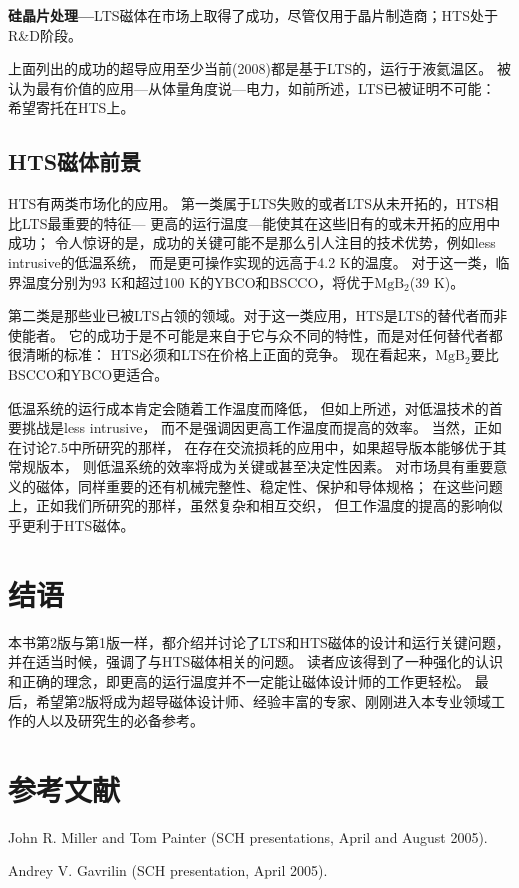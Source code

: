 \textbf{硅晶片处理---}LTS磁体在市场上取得了成功，尽管仅用于晶片制造商；HTS处于R\&D阶段。

上面列出的成功的超导应用至少当前(2008)都是基于LTS的，运行于液氦温区。
被认为最有价值的应用---从体量角度说---电力，如前所述，LTS已被证明不可能：
希望寄托在HTS上。

\subsection{HTS磁体前景}
HTS有两类市场化的应用。
第一类属于LTS失败的或者LTS从未开拓的，HTS相比LTS最重要的特征---
更高的运行温度---能使其在这些旧有的或未开拓的应用中成功；
令人惊讶的是，成功的关键可能不是那么引人注目的技术优势，例如less intrusive的低温系统，
而是更可操作实现的远高于4.2 K的温度。
对于这一类，临界温度分别为93 K和超过100 K的YBCO和BSCCO，将优于$\mathrm{MgB_2}$(39 K)。
	
第二类是那些业已被LTS占领的领域。对于这一类应用，HTS是LTS的替代者而非使能者。
它的成功于是不可能是来自于它与众不同的特性，而是对任何替代者都很清晰的标准：
HTS必须和LTS在价格上正面的竞争。
现在看起来，$\mathrm{MgB_2}$要比BSCCO和YBCO更适合。
	
低温系统的运行成本肯定会随着工作温度而降低，
但如上所述，对低温技术的首要挑战是less intrusive，
而不是强调因更高工作温度而提高的效率。
当然，正如在讨论7.5中所研究的那样，
在存在交流损耗的应用中，如果超导版本能够优于其常规版本，
则低温系统的效率将成为关键或甚至决定性因素。
对市场具有重要意义的磁体，同样重要的还有机械完整性、稳定性、保护和导体规格；
在这些问题上，正如我们所研究的那样，虽然复杂和相互交织，
但工作温度的提高的影响似乎更利于HTS磁体。	

\section{结语}
本书第2版​​与第1版一样，都介绍并讨论了LTS和HTS磁体的设计和运行关键问题，
并在适当时候，强调了与HTS磁体相关的问题。
读者应该得到了一种强化的认识和正确的理念，即更高的运行温度并不一定能让磁体设计师的工作更轻松。
最后，希望第2版将成为超导磁体设计师、经验丰富的专家、刚刚进入本专业领域工作的人以及研究生的必备参考。

\section*{参考文献}
\noindent [9.1] John R. Miller and Tom Painter (SCH presentations, April and August 2005).

\noindent [9.2] Andrey V. Gavrilin (SCH presentation, April 2005).

